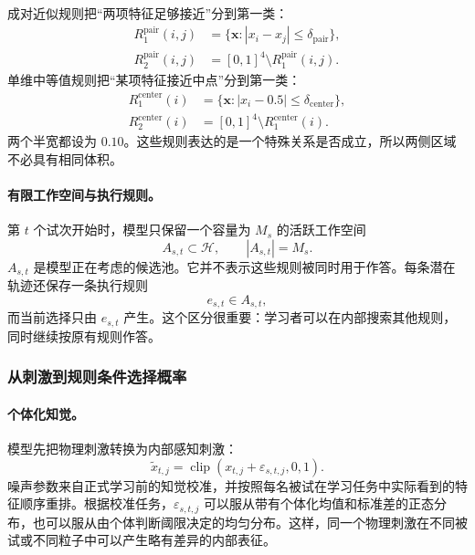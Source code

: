 成对近似规则把“两项特征足够接近”分到第一类：
\begin{align}
R_1^{\mathrm{pair}}(i,j)
&=\{\mathbf x:|x_i-x_j|\leq\delta_{\mathrm{pair}}\},
\nonumber\\
R_2^{\mathrm{pair}}(i,j)
&=[0,1]^4\setminus R_1^{\mathrm{pair}}(i,j).
\label{eq:dynamic-pair-band}
\end{align}
单维中等值规则把“某项特征接近中点”分到第一类：
\begin{align}
R_1^{\mathrm{center}}(i)
&=\{\mathbf x:|x_i-0.5|\leq\delta_{\mathrm{center}}\},
\nonumber\\
R_2^{\mathrm{center}}(i)
&=[0,1]^4\setminus R_1^{\mathrm{center}}(i).
\label{eq:dynamic-center-band}
\end{align}
两个半宽都设为 $0.10$。这些规则表达的是一个特殊关系是否成立，所以两侧区域不必具有相同体积。

\paragraph{有限工作空间与执行规则。}
第 $t$ 个试次开始时，模型只保留一个容量为 $M_s$ 的活跃工作空间
\begin{equation}
A_{s,t}\subset\mathcal H,
\qquad |A_{s,t}|=M_s.
\label{eq:dynamic-active-set}
\end{equation}
$A_{s,t}$ 是模型正在考虑的候选池。它并不表示这些规则被同时用于作答。每条潜在轨迹还保存一条执行规则
\begin{equation}
e_{s,t}\in A_{s,t},
\label{eq:dynamic-executed-rule}
\end{equation}
而当前选择只由 $e_{s,t}$ 产生。这个区分很重要：学习者可以在内部搜索其他规则，同时继续按原有规则作答。


\subsubsection{从刺激到规则条件选择概率}

\paragraph{个体化知觉。}
模型先把物理刺激转换为内部感知刺激：
\begin{equation}
\widetilde x_{t,j}
=\operatorname{clip}(x_{t,j}+\varepsilon_{s,t,j},0,1).
\label{eq:dynamic-perception}
\end{equation}
噪声参数来自正式学习前的知觉校准，并按照每名被试在学习任务中实际看到的特征顺序重排。根据校准任务，$\varepsilon_{s,t,j}$ 可以服从带有个体化均值和标准差的正态分布，也可以服从由个体判断阈限决定的均匀分布。这样，同一个物理刺激在不同被试或不同粒子中可以产生略有差异的内部表征。

